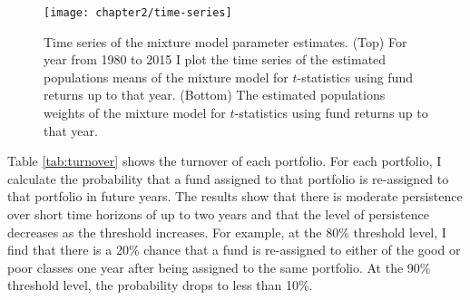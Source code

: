 		\begin{figure}[t]
			\small
			\centering
			\texttt{[image: chapter2/time-series]}
			\captionsetup{skip=-20pt, font=footnotesize, justification=justified, width=\textwidth}
			\caption[Time series of the mixture model parameter estimates]{Time series of the mixture model parameter estimates. (Top) For year from 1980 to 2015 I plot the time series of the estimated populations means of the mixture model for $t$-statistics using fund returns up to that year. (Bottom) The estimated populations weights of the mixture model for $t$-statistics using fund returns up to that year.}
			\label{fig:estimates}
		\end{figure}

		Table \ref{tab:turnover} shows the turnover of each portfolio.  For each portfolio, I calculate the probability that a fund assigned to that portfolio is re-assigned to that portfolio in future years.  The results show that there is moderate persistence over short time horizons of up to two years and that the level of persistence decreases as the threshold increases. For example, at the 80\% threshold level, I find that there is a 20\% chance that a fund is re-assigned to either of the good or poor classes one year after being assigned to the same portfolio.  At the 90\% threshold level, the probability drops to less than 10\%.

